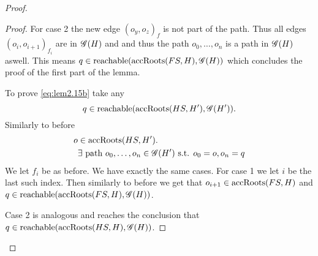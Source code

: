 \begin{proof}
\begin{description}
\begin{description}
\begin{description}
\begin{proof}
                For case 2 the new edge $(o_y, o_z)_f$ is not part of the path.
                Thus all edges $(o_i, o_{i+1})_{f_i}$ are in $\mathscr{G}(H)$ and and
                thus the path $o_0, \dots, o_n$ is a path in $\mathscr{G}(H)$ aswell.
                This means $q \in \mbox{$\mathrm{reachable}$}(\mbox{$\mathrm{accRoots}$}(FS, H), \mathscr{G}(H))$ which
                concludes the proof of the first part of the lemma.

                To prove \eqref{eq:lem2.15b} take any
                \begin{equation}
                  q \in \mbox{$\mathrm{reachable}$}(\mbox{$\mathrm{accRoots}$}(HS, H'), \mathscr{G}(H')).
                \end{equation}
                Similarly to before
                \begin{equation}
                  \begin{aligned}
                    o &\in \mbox{$\mathrm{accRoots}$}(HS, H'). \\
                    & \exists \text{ path } o_0, \dots, o_n \in \mathscr{G}(H')
                    \text{ s.t. } o_0 = o, o_n = q
                  \end{aligned}
                \end{equation}
                We let $f_i$ be as before.
                We have exactly the same cases. For case 1 we let $i$ be the last
                such index. Then similarly to before we get that $o_{i+1} \in
                \mbox{$\mathrm{accRoots}$}(FS, H)$ and $q \in \mbox{$\mathrm{reachable}$}(\mbox{$\mathrm{accRoots}$}(FS, H),
                \mathscr{G}(H))$.
                
                Case 2 is analogous and reaches the conclusion that $q \in
                \mbox{$\mathrm{reachable}$}(\mbox{$\mathrm{accRoots}$}(HS, H), \mathscr{G}(H))$.


\end{proof}
\end{description}
\end{description}
\end{description}
\end{proof}
